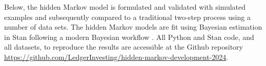 Below, the hidden Markov model is formulated
and validated with simulated examples and 
subsequently compared
to a traditional two-step process using
a number of data sets. The hidden Markov
models are fit using Bayesian estimation
in Stan \citep{stan2017} following a modern Bayesian
workflow \citep{gelman2020}.
All Python and Stan code, and all datasets, to 
reproduce the results
are accessible at the Github repository
\url{https://github.com/LedgerInvesting/hidden-markov-development-2024}.

